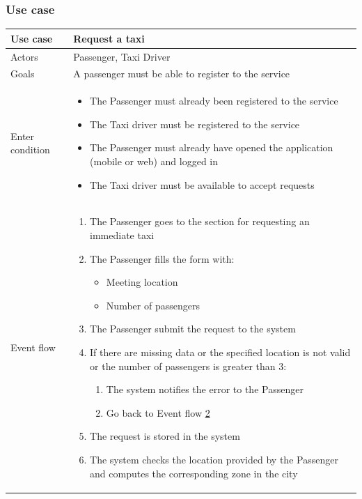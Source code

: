 \subsubsection{Use case}
\begin{table}[H]
\centering
\begin{longtable}{| p{} | p{} |} \hline
Use case & \textbf{Request a taxi} \\ \hline 
Actors & Passenger, Taxi Driver \\ \hline
Goals & A passenger must be able to register to the service \\ \hline
Enter condition & \begin{itemize}
					\item The Passenger must already been registered to the service
					\item The Taxi driver must be registered to the service
					\item The Passenger must already have opened the application (mobile or web) and logged in
					\item The Taxi driver must be available to accept requests
					\end{itemize} \\ \hline
Event flow & \begin{enumerate}
				\item The Passenger goes to the section for requesting an immediate taxi
				\item \label{fillForm} The Passenger fills the form with:
				\begin{itemize}
					\item Meeting location
					\item Number of passengers
				\end{itemize}
				\item The Passenger submit the request to the system
				\item If there are missing data or the specified location is not valid or the number of passengers is greater than 3:
				\begin{enumerate}
					\item The system notifies the error to the Passenger
					\item Go back to Event flow \ref{fillForm}
				\end{enumerate}
				\item The request is stored in the system
				\item The system checks the location provided by the Passenger and computes the corresponding zone in the city

\end{enumerate}
\end{longtable}
\end{table}
